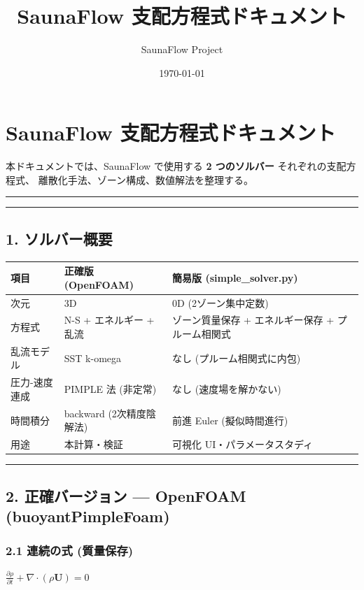 \documentclass[a4paper,11pt]{article}
\title{\textbf{SaunaFlow 支配方程式ドキュメント}}
\author{SaunaFlow Project}
\date{\today}
\begin{document}
\maketitle
\tableofcontents
\newpage

\section{SaunaFlow 支配方程式ドキュメント}

本ドキュメントでは、SaunaFlow で使用する \textbf{2 つのソルバー} それぞれの支配方程式、
離散化手法、ゾーン構成、数値解法を整理する。

\bigskip\hrule\bigskip

\bigskip\hrule\bigskip

\subsection{1. ソルバー概要}

{\small
\noindent
\begin{tabularx}{\textwidth}{|L|L|L|}
\hline
\textbf{項目} & \textbf{正確版 (OpenFOAM)} & \textbf{簡易版 (simple\_solver.py)} \\
\hline
次元 & 3D & 0D (2ゾーン集中定数) \\
\hline
方程式 & N-S + エネルギー + 乱流 & ゾーン質量保存 + エネルギー保存 + プルーム相関式 \\
\hline
乱流モデル & SST k-omega & なし (プルーム相関式に内包) \\
\hline
圧力-速度連成 & PIMPLE 法 (非定常) & なし (速度場を解かない) \\
\hline
時間積分 & backward (2次精度陰解法) & 前進 Euler (擬似時間進行) \\
\hline
用途 & 本計算・検証 & 可視化 UI・パラメータスタディ \\
\hline
\end{tabularx}
}


\bigskip\hrule\bigskip

\subsection{2. 正確バージョン — OpenFOAM (buoyantPimpleFoam)}

\subsubsection{2.1 連続の式 (質量保存)}

$
\frac{\partial \rho}{\partial t} + \nabla \cdot (\rho \mathbf{U}) = 0
$
\end{document}
